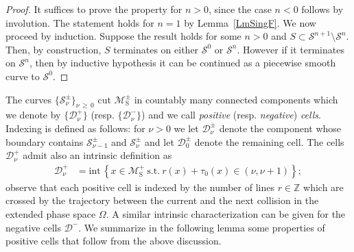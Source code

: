 \documentclass[AHL, Unicode, longabstracts,published]{cedram}
\newcommand{\ct}{r}
\newcommand{\fft}{\tau}
\newcommand{\st}{\ \text{s.t.}\ }
\newcommand{\intr}[1]{\mathrm{int}\,#1}
\newcommand{\bZ}{\mathbb{Z}}
\newcommand{\cell}{\mathcal{D}}
\newcommand{\csp}{\mathcal{M}}
\newcommand{\csps}{\csp_\text{S}}
\newcommand{\exph}{\Omega}
\newcommand{\singPrivate}{\mathcal{S}}
\newcommand{\sing}[1]{\singPrivate^{#1}}
\newcommand{\singBoth}{\singPrivate^\pm}
\newcommand{\indCell}{\nu}
\begin{document}
\begin{proof}
It suffices to prove the property for $n > 0$, since the case $n < 0$ follows by involution. The statement holds for $n = 1$ by Lemma~\ref{LmSingF}. {We now proceed by induction. Suppose the result holds for some $n>0$ and} $S\subset\sing {n+1}\setminus\sing n$. {Then, by construction}, $S$ terminates on either $\sing0$ or $\sing n$. However if it terminates on $\sing n$, then by inductive hypothesis it can be continued as a piecewise smooth curve to $\sing 0$.
\end{proof}

The curves $\{\singBoth_{\indCell}\}_{\indCell\,\ge\,0}$ cut $\csps^\pm$ in countably many connected components which we denote by $\{\cell^+_\indCell\}$ (resp. $\{\cell^-_\indCell\}$) and we call
\emph{positive} (resp. \emph{negative}) \emph{cells}. Indexing is defined as follows: for $\indCell > 0$ we let $\cell^\pm_\indCell$ denote the component whose boundary contains $\singBoth_{\indCell-1}$ and $\singBoth_{\indCell}$ and let $\cell^\pm_0$ denote the remaining cell. The cells $\cell^+_\indCell$ admit also an intrinsic definition as
\begin{align}\label{e_defCell}
\cell^+_\indCell &= \intr\left\{x\in\csps^+ \st \ct(x)+\fft_0(x)\in(\indCell,\indCell+1)\right\};
\end{align}
observe that each positive cell is indexed by the number of lines $\ct \in \bZ$ which are crossed by the trajectory between the current and the next collision in the extended phase space $\exph$. A similar intrinsic characterization can be given for the negative cells $\cell^-$. We summarize in the following lemma some properties of positive cells that follow from the above discussion.
\end{document}
